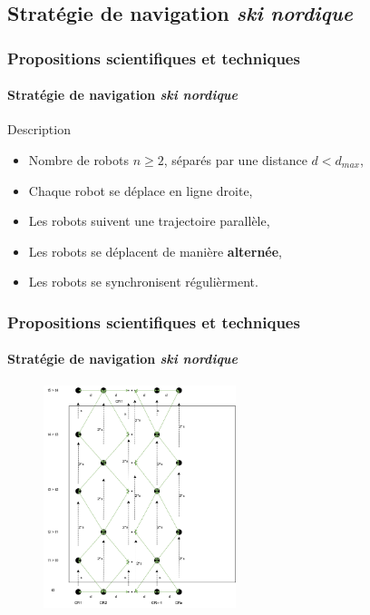 \documentclass{beamer}
\begin{document}
		\subsection{Stratégie de navigation \textit{ski nordique}}
			\begin{frame}
				\frametitle{Propositions scientifiques et techniques}
				\framesubtitle{Stratégie de navigation \textit{ski nordique}}
				\begin{block}{Description}
					\begin{itemize}
						\item Nombre de robots $n \ge 2$, séparés par une distance $d < d_{max}$,
						\item Chaque robot se déplace en ligne droite,
						\item Les robots suivent une trajectoire parallèle,
						\item Les robots se déplacent de manière \textbf{alternée},
						\item Les robots se synchronisent régulièrment.
					\end{itemize}
				\end{block}
			\end{frame}
			\begin{frame}
				\frametitle{Propositions scientifiques et techniques}
				\framesubtitle{Stratégie de navigation \textit{ski nordique}}
				\begin{figure}
					\centering
					\includegraphics[width=0.5\textwidth]{graphics/ski_nordique_1.png}
				\end{figure}
			\end{frame}
\end{document}
